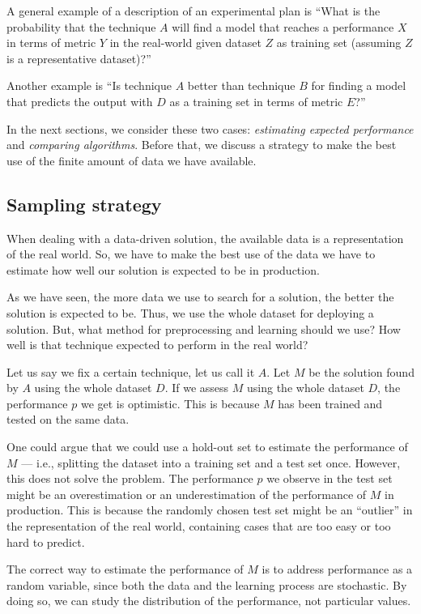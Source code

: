 A general example of a description of an experimental plan is ``What is the probability that
the technique $A$ will find a model that reaches a performance $X$ in terms of metric $Y$ in
the real-world given dataset $Z$ as training set (assuming $Z$ is a representative
dataset)?''

Another example is ``Is technique $A$ better than technique $B$ for finding a model that
predicts the output with $D$ as a training set in terms of metric $E$?''

In the next sections, we consider these two cases: \emph{estimating expected performance}
and \emph{comparing algorithms}.  Before that, we discuss a strategy to make the best use
of the finite amount of data we have available.

\subsection{Sampling strategy}

When dealing with a data-driven solution, the available data is a representation of the
real world.  So, we have to make the best use of the data we have to estimate how well our
solution is expected to be in production.

As we have seen, the more data we use to search for a solution, the better the solution is
expected to be.  Thus, we use the whole dataset for deploying a solution.  But, what
method for preprocessing and learning should we use?  How well is that technique
expected to perform in the real world?

Let us say we fix a certain technique, let us call it $A$.  Let $M$ be the solution found
by $A$ using the whole dataset $D$.  If we assess $M$ using the whole dataset $D$, the
performance $p$ we get is optimistic.  This is because $M$ has been trained and tested
on the same data.

One could argue that we could use a hold-out set to estimate the performance of $M$ ---
i.e., splitting the dataset into a training set and a test set once.  However, this does
not solve the problem.  The performance $p$ we observe in the test set might be an overestimation
or an underestimation of the performance of $M$ in production.  This is because the
randomly chosen test set might be an ``outlier'' in the representation of the real world,
containing cases that are too easy or too hard to predict.

The correct way to estimate the performance of $M$ is to address performance as a
random variable, since both the data and the learning process are stochastic.
By doing so, we can study the distribution of the performance, not particular values.

